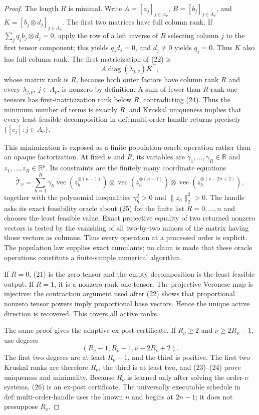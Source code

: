 \documentclass{article}
\begin{document}
\begin{proof}
The length \(R\) is minimal. Write \(A=[a_j]_{j\in A_\nu}\), \(B=[b_j]_{j\in A_\nu}\), and \(K=[b_j\otimes d_j]_{j\in A_\nu}\). The first two matrices have full column rank. If \(\sum_j q_jb_j\otimes d_j=0\), apply the row of a left inverse of \(B\) selecting column \(j\) to the first tensor component; this yields \(q_jd_j=0\), and \(d_j\ne0\) yields \(q_j=0\). Thus \(K\) also has full column rank. The first matricization of (22) is
\[
 A\operatorname{diag}(\lambda_{j,\nu})K^\top, \tag{24}
\]
whose matrix rank is \(R\), because both outer factors have column rank \(R\) and every \(\lambda_{j,\nu}\), \(j\in A_\nu\), is nonzero by definition. A sum of fewer than \(R\) rank-one tensors has first-matricization rank below \(R\), contradicting (24). Thus the minimum number of terms is exactly \(R\), and Kruskal uniqueness implies that every least feasible decomposition in \(\mathrm{def{:}multi\text{-}order\text{-}handle}\) returns precisely \(\{[c_j]:j\in A_\nu\}\).

This minimization is exposed as a finite population-oracle operation rather than an opaque factorization. At fixed \(\nu\) and \(R\), its variables are \(\gamma_1,\ldots,\gamma_R\in\mathbb R\) and \(z_1,\ldots,z_R\in\mathbb R^p\). Its constraints are the finitely many coordinate equations
\[
 \widetilde{\mathcal T}_\nu
 =\sum_{h=1}^{R}\gamma_h
 \operatorname{vec}(z_h^{\otimes(n-1)})\otimes
 \operatorname{vec}(z_h^{\otimes(n-1)})\otimes
 \operatorname{vec}(z_h^{\otimes(\nu-2n+2)}), \tag{25}
\]
together with the polynomial inequalities \(\gamma_h^2>0\) and \(\lVert z_h\rVert_2^2>0\). The handle asks its exact feasibility oracle about (25) for the finite list \(R=0,\ldots,n\) and chooses the least feasible value. Exact projective equality of two returned nonzero vectors is tested by the vanishing of all two-by-two minors of the matrix having those vectors as columns. Thus every operation at a processed order is explicit. The population law supplies exact cumulants; no claim is made that these oracle operations constitute a finite-sample numerical algorithm.

If \(R=0\), (21) is the zero tensor and the empty decomposition is the least feasible output. If \(R=1\), it is a nonzero rank-one tensor. The projective Veronese map is injective: the contraction argument used after (22) shows that proportional nonzero tensor powers imply proportional base vectors. Hence the unique active direction is recovered. This covers all active ranks.

The same proof gives the adaptive ex-post certificate. If \(R_\nu\ge2\) and \(\nu\ge2R_\nu-1\), use degrees
\[
 (R_\nu-1,R_\nu-1,\nu-2R_\nu+2). \tag{26}
\]
The first two degrees are at least \(R_\nu-1\), and the third is positive. The first two Kruskal ranks are therefore \(R_\nu\), the third is at least two, and (23)--(24) prove uniqueness and minimality. Because \(R_\nu\) is learned only after solving the order-\(\nu\) systems, (26) is an ex-post certificate. The universally executable schedule in \(\mathrm{def{:}multi\text{-}order\text{-}handle}\) uses the known \(n\) and begins at \(2n-1\); it does not presuppose \(R_\nu\).


\end{proof}
\end{document}
